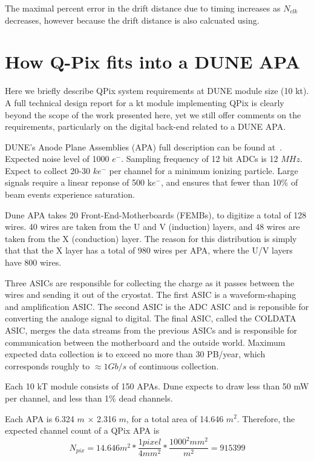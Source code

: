 The maximal percent error in the drift distance due to timing increases as $N_{clk}$ decreases, however because the drift distance is also calcuated using.

\section{How Q-Pix fits into a DUNE APA}

Here we briefly describe QPix system requirements at DUNE module size (10 kt).
A full technical design report for a kt module implementing QPix is clearly beyond the scope of the work presented here, yet we still offer comments on the requirements, particularly on the digital back-end related to a DUNE APA.

DUNE's Anode Plane Assemblies (APA) full description can be found at~\citep{DUNE-FD_TDRv4:Abi_2020}.
Expected noise level of 1000 $e^{-}$.
Sampling frequency of 12 bit ADCs is 12 $\unit{MHz}$.
Expect to collect 20-30 $k e^{-}$ per channel for a minimum ionizing particle.
Large signals require a linear reponse of 500 k$e^{-}$, and ensures that fewer than 10\% of beam events experience saturation.

Dune APA takes 20 Front-End-Motherboards (FEMBs), to digitize a total of 128 wires.
40 wires are taken from the U and V (induction) layers, and 48 wires are taken from the X (conduction) layer.
The reason for this distribution is simply that that the X layer has a total of 980 wires per APA, where the U/V layers have 800 wires.

Three ASICs are responsible for collecting the charge as it passes between the wires and sending it out of the cryostat.
The first ASIC is a waveform-shaping and amplification ASIC.
The second ASIC is the ADC ASIC and is reponsible for converting the analoge signal to digital.
The final ASIC, called the COLDATA ASIC, merges the data streams from the previous ASICs and is responsible for communication between the motherboard and the outside world.
Maximum expected data collection is to exceed no more than 30 PB/year, which corresponds roughly to $\approx 1 Gb/s$ of continuous collection.

Each 10 kT module consists of 150 APAs.
Dune expects to draw less than 50 mW per channel, and less than 1\% dead channels.

Each APA is 6.324 $\unit{m}$ $\times$ 2.316 $\unit{m}$, for a total area of 14.646 $\unit{m^{2}}$.
Therefore, the expected channel count of a QPix APA is
\begin{equation}
  N_{pix} = 14.646 m^{2} * \frac{1 pixel}{4 mm^{2}} * \frac{ 1000^{2} mm^{2} }{m^{2}} = 915399
\end{equation}

